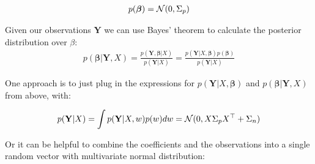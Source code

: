 \begin{gather*}
    p(\boldsymbol{\beta}) = \operatorname{\mathcal{N}}(0, \Sigma_p)
\end{gather*}

Given our observations $\mathbf{Y}$  we can use Bayes' theorem to calculate the posterior distribution over $\beta$:
\begin{gather*}
    p(\boldsymbol{\beta}| \mathbf{Y}, X) = \frac{p(\mathbf{Y},\boldsymbol{\beta}|X)}{p(\mathbf{Y}|X)} =
    \frac{p(\mathbf{Y}|X,\boldsymbol{\beta})p(\boldsymbol{\beta})}{p(\mathbf{Y}|X)}
\end{gather*}

One approach is to just plug in the expressions for
$p(\mathbf{Y}|X,\boldsymbol{\beta})$ and $p(\boldsymbol{\beta}|\mathbf{Y}, X)$ from above, with:

\begin{gather*}
    p(\mathbf{Y}|X) = \int p(\mathbf{Y}|X,w) p(w) dw = \operatorname{\mathcal{N}}(0, X \Sigma_p X^{\top} + \Sigma_n)
\end{gather*}

Or it can be helpful to combine the coefficients and the observations into a single random vector with
multivariate normal distribution:

